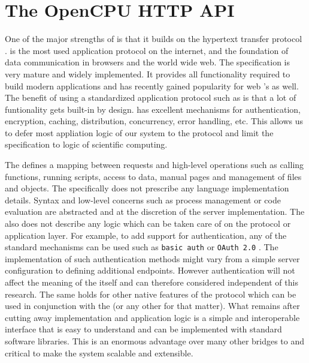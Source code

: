 \section{The OpenCPU HTTP API}

One of the major strengths of \OpenCPU is that it builds on the hypertext transfer protocol \citep{rfc2616}. \HTTP is the most used application protocol on the internet, and the foundation of data communication in browsers and the world wide web. The \HTTP specification is very mature and widely implemented. It provides all functionality required to build modern applications and has recently gained popularity for web \API's as well. The benefit of using a standardized application protocol such as \HTTP is that a lot of funtionality gets built-in by design. \HTTP has excellent mechanisms for authentication, encryption, caching, distribution, concurrency, error handling, etc. This allows us to defer most appliation logic of our system to the protocol and limit the \API specification to logic of scientific computing. 

The \OpenCPU \API defines a mapping between \HTTP requests and high-level operations such as calling functions, running scripts, access to data, manual pages and management of files and objects. The \API specifically does not prescribe any language implementation details. Syntax and low-level concerns such as process management or code evaluation are abstracted and at the discretion of the server implementation. The \API also does not describe any logic which can be taken care of on the protocol or application layer. For example, to add support for authentication, any of the standard mechanisms can be used such as \texttt{basic auth} \citep{franks1999rfc} or \texttt{OAuth 2.0} \citep{hardt2012oauth}. The implementation of such authentication methods might vary from a simple server configuration to defining additional endpoints. However authentication will not affect the meaning of the \API itself and can therefore considered independent of this research. The same holds for other native features of the \HTTP protocol which can be used in conjunction with the \OpenCPU \API (or any other \HTTP \API for that matter). What remains after cutting away implementation and application logic is a simple and interoperable interface that is easy to understand and can be implemented with standard \HTTP software libraries. This is an enormous advantage over many other bridges to \R and critical to make the system scalable and extensible. 

